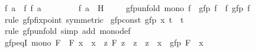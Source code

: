 \begin{isabellebody}
\ {\isachardoublequoteopen}f\ {\isacharquery}{\kern0pt}a\ {\isasymle}\ f\ {\isacharparenleft}{\kern0pt}f\ {\isacharquery}{\kern0pt}a{\isacharparenright}{\kern0pt}{\isachardoublequoteclose}\ \isacommand{{\isachardot}{\kern0pt}{\isachardot}{\kern0pt}}\isamarkupfalse%
\isanewline
\ \ \ \ \isamarkupfalse%
\ \isamarkupfalse%
\ {\isachardoublequoteopen}f\ {\isacharquery}{\kern0pt}a\ {\isasymin}\ {\isacharquery}{\kern0pt}H{\isachardoublequoteclose}\ \isacommand{{\isachardot}{\kern0pt}{\isachardot}{\kern0pt}}\isamarkupfalse%
\isanewline
\ \ \isamarkupfalse%
\isanewline
{}\isamarkupfalse%
%
\endisatagproof
{\isafoldproof}%
%
\isadelimproof
\isanewline
%
\endisadelimproof
\isanewline
{}\isamarkupfalse%
\ gfp{\isacharunderscore}{\kern0pt}unfold{\isacharcolon}{\kern0pt}\ {\isachardoublequoteopen}mono\ f\ {\isasymLongrightarrow}\ gfp\ f\ {\isacharequal}{\kern0pt}\ f\ {\isacharparenleft}{\kern0pt}gfp\ f{\isacharparenright}{\kern0pt}{\isachardoublequoteclose}\isanewline
%
\isadelimproof
\ \ %
\endisadelimproof
%
\isatagproof
{}\isamarkupfalse%
\ {\isacharparenleft}{\kern0pt}rule\ gfp{\isacharunderscore}{\kern0pt}fixpoint\ {\isacharbrackleft}{\kern0pt}symmetric{\isacharbrackright}{\kern0pt}{\isacharparenright}{\kern0pt}%
\endisatagproof
{\isafoldproof}%
%
\isadelimproof
\isanewline
%
\endisadelimproof
\isanewline
{}\isamarkupfalse%
\ gfp{\isacharunderscore}{\kern0pt}const{\isacharcolon}{\kern0pt}\ {\isachardoublequoteopen}gfp\ {\isacharparenleft}{\kern0pt}{\isasymlambda}x{\isachardot}{\kern0pt}\ t{\isacharparenright}{\kern0pt}\ {\isacharequal}{\kern0pt}\ t{\isachardoublequoteclose}\isanewline
%
\isadelimproof
\ \ %
\endisadelimproof
%
\isatagproof
{}\isamarkupfalse%
\ {\isacharparenleft}{\kern0pt}rule\ gfp{\isacharunderscore}{\kern0pt}unfold{\isacharparenright}{\kern0pt}\ {\isacharparenleft}{\kern0pt}simp\ add{\isacharcolon}{\kern0pt}\ mono{\isacharunderscore}{\kern0pt}def{\isacharparenright}{\kern0pt}%
\endisatagproof
{\isafoldproof}%
%
\isadelimproof
\isanewline
%
\endisadelimproof
\isanewline
{}\isamarkupfalse%
\ gfp{\isacharunderscore}{\kern0pt}eqI{\isacharcolon}{\kern0pt}\ {\isachardoublequoteopen}mono\ F\ {\isasymLongrightarrow}\ F\ x\ {\isacharequal}{\kern0pt}\ x\ {\isasymLongrightarrow}\ {\isacharparenleft}{\kern0pt}{\isasymAnd}z{\isachardot}{\kern0pt}\ F\ z\ {\isacharequal}{\kern0pt}\ z\ {\isasymLongrightarrow}\ z\ {\isasymle}\ x{\isacharparenright}{\kern0pt}\ {\isasymLongrightarrow}\ gfp\ F\ {\isacharequal}{\kern0pt}\ x{\isachardoublequoteclose}\isanewline

\end{isabellebody}
